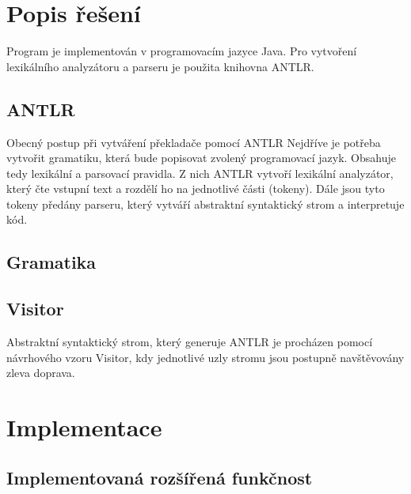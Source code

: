 \documentclass{style}
\begin{document}
\chapter{Popis řešení}
Program je implementován v programovacím jazyce Java. Pro vytvoření lexikálního analyzátoru a parseru je použita knihovna ANTLR.

\section{ANTLR}
Obecný postup při vytváření překladače pomocí ANTLR
Nejdříve je potřeba vytvořit gramatiku, která bude popisovat zvolený programovací jazyk. Obsahuje tedy lexikální a parsovací pravidla. Z nich ANTLR vytvoří lexikální analyzátor, který čte vstupní text a rozdělí ho na jednotlivé části (tokeny). Dále jsou tyto tokeny předány parseru, který vytváří abstraktní syntaktický strom a interpretuje kód.

\section{Gramatika}

\section{Visitor}
Abstraktní syntaktický strom, který generuje ANTLR je procházen pomocí návrhového vzoru Visitor, kdy jednotlivé uzly stromu jsou postupně navštěvovány zleva doprava.

\chapter{Implementace}

\section{Implementovaná rozšířená funkčnost}
\end{document}
